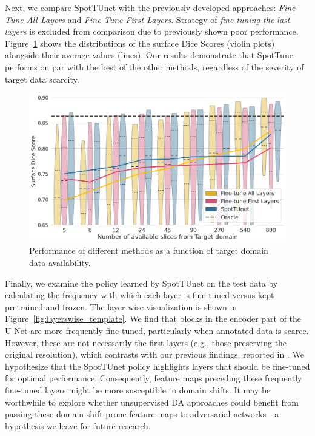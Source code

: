 Next, we compare SpotTUnet with the previously developed approaches: \textit{Fine-Tune All Layers} and \textit{Fine-Tune First Layers}. Strategy of \textit{fine-tuning the last layers} is excluded from comparison due to previously shown poor performance. Figure~\ref{fig:sdcs} shows the distributions of the surface Dice Scores (violin plots) alongside their average values (lines). Our results demonstrate that SpotTune performs on par with the best of the other methods, regardless of the severity of target data scarcity.

\begin{figure}[h!]
	\centering
	\includegraphics[width=\textwidth]{Dissertation/Figures/2_mri/sdsc.png}
	\caption{Performance of different methods as a function of target domain data availability.}
	\label{fig:sdcs}
\end{figure}

Finally, we examine the policy learned by SpotTUnet on the test data by calculating the frequency with which each layer is fine-tuned versus kept pretrained and frozen. The layer-wise visualization is shown in Figure~\ref{fig:layerswise_template}. We find that blocks in the encoder part of the U-Net are more frequently fine-tuned, particularly when annotated data is scarce. However, these are not necessarily the first layers (e.g., those preserving the original resolution), which contrasts with our previous findings, reported in \cite{shirokikh2020first}. We hypothesize that the SpotTUnet policy highlights layers that should be fine-tuned for optimal performance. Consequently, feature maps preceding these frequently fine-tuned layers might be more susceptible to domain shifts. It may be worthwhile to explore whether unsupervised DA approaches \cite{kamnitsas2017unsupervised, zhao2021robust} could benefit from passing these domain-shift-prone feature maps to adversarial networks---a hypothesis we leave for future research.

